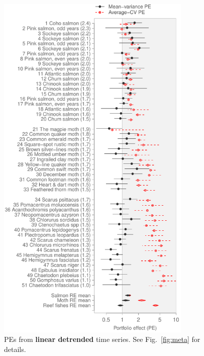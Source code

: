 \begin{figure}[htbp]
  \centering
  \includegraphics[height=6.8in]{prophets/PE_comparison_z_meta_detrend_taxa_20121214.pdf}
  \caption{PEs from \textbf{linear detrended} time series. See
    Fig.~\ref{fig:meta} for details.
}
\label{fig:meta-detrend}
\end{figure}

